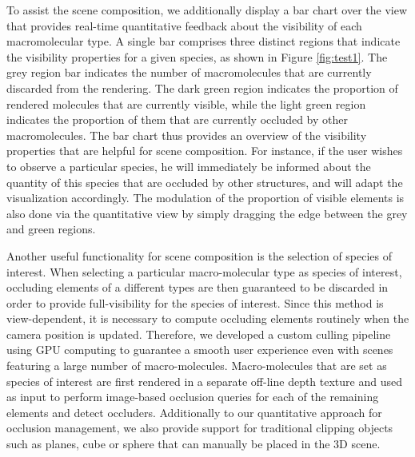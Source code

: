 To assist the scene composition, we additionally display a bar chart over the view that provides real-time quantitative feedback about the visibility of each macromolecular type.
A single bar comprises three distinct regions that indicate the visibility properties for a given species, as shown in Figure \ref{fig:test1}.
The grey region bar indicates the number of macromolecules that are currently discarded from the rendering.
The dark green region indicates the proportion of rendered molecules that are currently visible, while the light green region indicates the proportion of them that are currently occluded by other macromolecules.
The bar chart thus provides an overview of the visibility properties that are helpful for scene composition.
For instance, if the user wishes to observe a particular species, he will immediately be informed about the quantity of this species that are occluded by other structures, and will adapt the visualization accordingly.
The modulation of the proportion of visible elements is also done via the quantitative view by simply dragging the edge between the grey and green regions.

Another useful functionality for scene composition is the selection of species of interest.
When selecting a particular macro-molecular type as species of interest, occluding elements of a different types are then guaranteed to be discarded in order to provide full-visibility for the species of interest.
Since this method is view-dependent, it is necessary to compute occluding elements routinely when the camera position is updated.
Therefore, we developed a custom culling pipeline using GPU computing to guarantee a smooth user experience even with scenes featuring a large number of macro-molecules.
Macro-molecules that are set as species of interest are first rendered in a separate off-line depth texture and used as input to perform image-based occlusion queries for each of the remaining elements and detect occluders.
Additionally to our quantitative approach for occlusion management, we also provide support for traditional clipping objects such as planes, cube or sphere that can manually be placed in the 3D scene.


